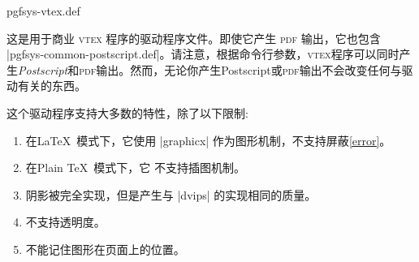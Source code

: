 \begin{filedescription}{pgfsys-vtex.def}

    这是用于商业 \textsc{vtex} 程序的驱动程序文件。即使它产生 \textsc{pdf} 输出，它也包含 |pgfsys-common-postscript.def|。请注意，根据命令行参数，\textsc{vtex}程序可以同时产生\emph{Postscript}和\textsc{pdf}输出。然而，无论你产生Postscript或\textsc{pdf}输出不会改变任何与驱动有关的东西。


    这个驱动程序支持大多数\pgfname 的特性，除了以下限制:
    \begin{enumerate}
        \item 在\LaTeX\ 模式下，它使用 |graphicx| 作为图形机制，不支持屏蔽\ref{error}。
        \item 在Plain \TeX\ 模式下，它 不支持插图机制。
        \item 阴影被完全实现，但是产生与 |dvips| 的实现相同的质量。
        \item 不支持透明度。
        \item 不能记住图形在页面上的位置。
    \end{enumerate}
\end{filedescription}



